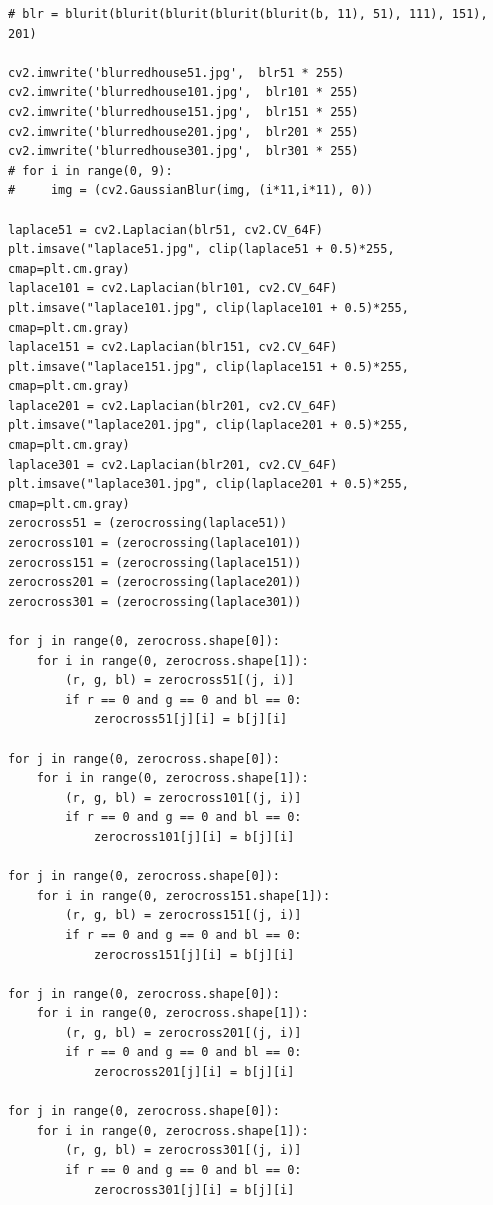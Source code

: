 \documentclass{article}
\begin{document}
\begin{verbatim}
# blr = blurit(blurit(blurit(blurit(blurit(b, 11), 51), 111), 151), 201)

cv2.imwrite('blurredhouse51.jpg',  blr51 * 255)
cv2.imwrite('blurredhouse101.jpg',  blr101 * 255)
cv2.imwrite('blurredhouse151.jpg',  blr151 * 255)
cv2.imwrite('blurredhouse201.jpg',  blr201 * 255)
cv2.imwrite('blurredhouse301.jpg',  blr301 * 255)
# for i in range(0, 9):
#     img = (cv2.GaussianBlur(img, (i*11,i*11), 0))

laplace51 = cv2.Laplacian(blr51, cv2.CV_64F)
plt.imsave("laplace51.jpg", clip(laplace51 + 0.5)*255, cmap=plt.cm.gray)
laplace101 = cv2.Laplacian(blr101, cv2.CV_64F)
plt.imsave("laplace101.jpg", clip(laplace101 + 0.5)*255, cmap=plt.cm.gray)
laplace151 = cv2.Laplacian(blr151, cv2.CV_64F)
plt.imsave("laplace151.jpg", clip(laplace151 + 0.5)*255, cmap=plt.cm.gray)
laplace201 = cv2.Laplacian(blr201, cv2.CV_64F)
plt.imsave("laplace201.jpg", clip(laplace201 + 0.5)*255, cmap=plt.cm.gray)
laplace301 = cv2.Laplacian(blr201, cv2.CV_64F)
plt.imsave("laplace301.jpg", clip(laplace201 + 0.5)*255, cmap=plt.cm.gray)
zerocross51 = (zerocrossing(laplace51))
zerocross101 = (zerocrossing(laplace101))
zerocross151 = (zerocrossing(laplace151))
zerocross201 = (zerocrossing(laplace201))
zerocross301 = (zerocrossing(laplace301))

for j in range(0, zerocross.shape[0]):
    for i in range(0, zerocross.shape[1]):
        (r, g, bl) = zerocross51[(j, i)]
        if r == 0 and g == 0 and bl == 0:
            zerocross51[j][i] = b[j][i]
            
for j in range(0, zerocross.shape[0]):
    for i in range(0, zerocross.shape[1]):
        (r, g, bl) = zerocross101[(j, i)]
        if r == 0 and g == 0 and bl == 0:
            zerocross101[j][i] = b[j][i]
            
for j in range(0, zerocross.shape[0]):
    for i in range(0, zerocross151.shape[1]):
        (r, g, bl) = zerocross151[(j, i)]
        if r == 0 and g == 0 and bl == 0:
            zerocross151[j][i] = b[j][i]
            
for j in range(0, zerocross.shape[0]):
    for i in range(0, zerocross.shape[1]):
        (r, g, bl) = zerocross201[(j, i)]
        if r == 0 and g == 0 and bl == 0:
            zerocross201[j][i] = b[j][i]
            
for j in range(0, zerocross.shape[0]):
    for i in range(0, zerocross.shape[1]):
        (r, g, bl) = zerocross301[(j, i)]
        if r == 0 and g == 0 and bl == 0:
            zerocross301[j][i] = b[j][i]
    

\end{verbatim}
\end{document}
